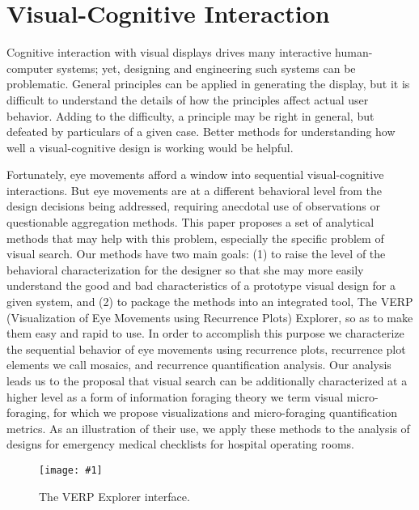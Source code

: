\documentclass{sigchi}
\newcommand{\insertpicture}[2]{\begin{center}\texttt{[image: \#1]}\end{center}}
\begin{document}
\section{Visual-Cognitive Interaction} Cognitive interaction with visual
displays drives many interactive human-computer systems; yet, designing and
engineering such systems can be problematic. General principles can be
applied in generating the display, but it is difficult to  understand the
details of how the principles affect actual user behavior. Adding to the
difficulty, a principle may be right in general, but defeated by
particulars of a given case. Better methods for understanding how well a
visual-cognitive design is working would be helpful. 

Fortunately, eye movements afford a window into sequential visual-cognitive
interactions. But eye movements are at a different behavioral level from
the design decisions being addressed, requiring anecdotal use of
observations or questionable aggregation methods. This paper proposes a set
of analytical methods that may help with this problem, especially the
specific problem of visual search. Our methods have two main goals: (1) to
raise the level of the behavioral characterization for the designer so that
she may more easily understand the good and bad characteristics of a
prototype visual design for a given system, and (2) to package the methods
into an integrated tool, The VERP (Visualization of Eye Movements using
Recurrence Plots) Explorer, so as to make them easy and rapid to use. In
order to accomplish this purpose we characterize the sequential behavior of
eye movements using recurrence plots, recurrence plot elements we call
mosaics, and recurrence quantification analysis. Our analysis leads us to
the proposal that visual search can be additionally characterized at a
higher level as a form of information foraging theory we term visual
micro-foraging, for which we propose visualizations and micro-foraging
quantification metrics. As an illustration of their use, we apply these
methods to the analysis of designs for emergency medical checklists for
hospital operating rooms.


\begin{figure*}
	\insertpicture{figures/interface.pdf}{0.85}
	\caption{The VERP Explorer interface.\label{fig:inteface}}
\end{figure*}
\end{document}
